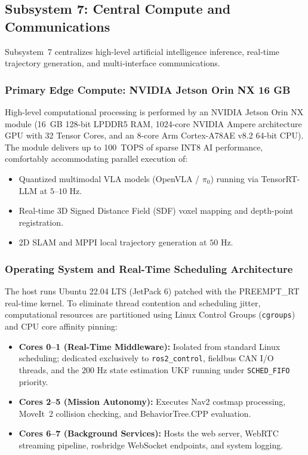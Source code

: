 \subsection{Subsystem 7: Central Compute and Communications}
\label{subsec:subsystem_7_compute}
Subsystem~7 centralizes high-level artificial intelligence inference, real-time trajectory generation, and multi-interface communications.

\subsubsection{Primary Edge Compute: NVIDIA Jetson Orin NX 16 GB}
High-level computational processing is performed by an NVIDIA Jetson Orin NX module (16~GB 128-bit LPDDR5 RAM, 1024-core NVIDIA Ampere architecture GPU with 32 Tensor Cores, and an 8-core Arm Cortex-A78AE v8.2 64-bit CPU). The module delivers up to 100~TOPS of sparse INT8 AI performance, comfortably accommodating parallel execution of:
\begin{itemize}[leftmargin=1.5em]
  \item Quantized multimodal VLA models (OpenVLA / $\pi_0$) running via TensorRT-LLM at $5\text{--}10\text{ Hz}$.
  \item Real-time 3D Signed Distance Field (SDF) voxel mapping and depth-point registration.
  \item 2D SLAM and MPPI local trajectory generation at $50\text{ Hz}$.
\end{itemize}

\subsubsection{Operating System and Real-Time Scheduling Architecture}
The host runs Ubuntu 22.04 LTS (JetPack 6) patched with the PREEMPT\_RT real-time kernel. To eliminate thread contention and scheduling jitter, computational resources are partitioned using Linux Control Groups (\texttt{cgroups}) and CPU core affinity pinning:
\begin{itemize}[leftmargin=1.5em]
  \item \textbf{Cores 0--1 (Real-Time Middleware):} Isolated from standard Linux scheduling; dedicated exclusively to \texttt{ros2\_control}, fieldbus CAN I/O threads, and the $200\text{ Hz}$ state estimation UKF running under \texttt{SCHED\_FIFO} priority.
  \item \textbf{Cores 2--5 (Mission Autonomy):} Executes Nav2 costmap processing, MoveIt~2 collision checking, and BehaviorTree.CPP evaluation.
  \item \textbf{Cores 6--7 (Background Services):} Hosts the web server, WebRTC streaming pipeline, rosbridge WebSocket endpoints, and system logging.
\end{itemize}

